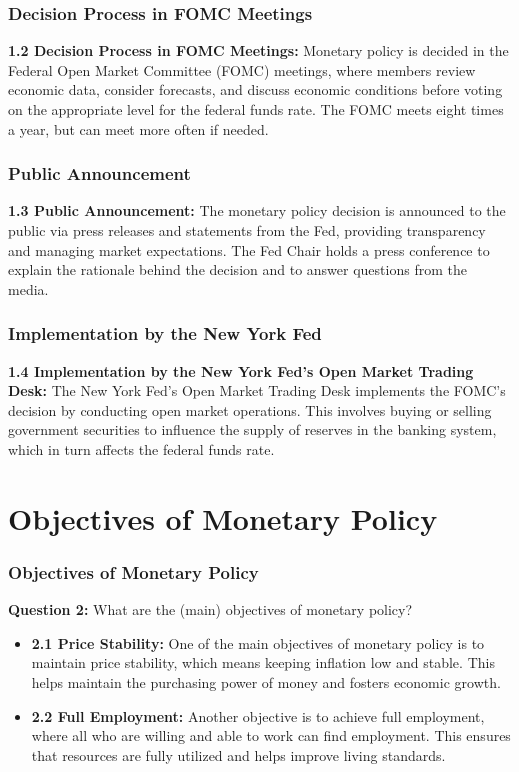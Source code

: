 \documentclass{beamer}
\begin{document}
\begin{frame}
    \frametitle{Decision Process in FOMC Meetings}
    \textbf{1.2 Decision Process in FOMC Meetings:} Monetary policy is decided in the Federal Open Market Committee (FOMC) meetings, where members review economic data, consider forecasts, and discuss economic conditions before voting on the appropriate level for the federal funds rate. The FOMC meets eight times a year, but can meet more often if needed.
\end{frame}

\begin{frame}
    \frametitle{Public Announcement}
    \textbf{1.3 Public Announcement:} The monetary policy decision is announced to the public via press releases and statements from the Fed, providing transparency and managing market expectations. The Fed Chair holds a press conference to explain the rationale behind the decision and to answer questions from the media.
\end{frame}

\begin{frame}
    \frametitle{Implementation by the New York Fed}
    \textbf{1.4 Implementation by the New York Fed's Open Market Trading Desk:} The New York Fed's Open Market Trading Desk implements the FOMC's decision by conducting open market operations. This involves buying or selling government securities to influence the supply of reserves in the banking system, which in turn affects the federal funds rate.
\end{frame}

\section{Objectives of Monetary Policy}
\begin{frame}
    \frametitle{Objectives of Monetary Policy}
    \textbf{Question 2:} What are the (main) objectives of monetary policy?
    \begin{itemize}
        \item \textbf{2.1 Price Stability:} One of the main objectives of monetary policy is to maintain price stability, which means keeping inflation low and stable. This helps maintain the purchasing power of money and fosters economic growth.
        \item \textbf{2.2 Full Employment:} Another objective is to achieve full employment, where all who are willing and able to work can find employment. This ensures that resources are fully utilized and helps improve living standards.
    \end{itemize}
\end{frame}
\end{document}
